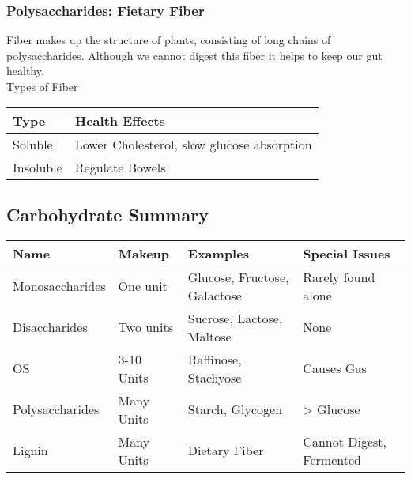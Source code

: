 \documentclass[letterpaper, 11pt]{article}
\begin{document}
\subsubsection{Polysaccharides: Fietary Fiber}
\label{sec:org4a1e430}
Fiber makes up the structure of plants, consisting of long chains of polysaccharides. Although we cannot digest this fiber it helps to keep our gut healthy.\\
Types of Fiber\\
\begin{center}
\begin{tabular}{ll}
Type & Health Effects\\
\hline
Soluble & Lower Cholesterol,  slow glucose absorption\\
Insoluble & Regulate Bowels\\
\end{tabular}
\end{center}
\subsection{Carbohydrate Summary}
\label{sec:org0b6fe23}
\begin{center}
\begin{tabular}{llll}
Name & Makeup & Examples & Special Issues\\
\hline
Monosaccharides & One unit & Glucose, Fructose, Galactose & Rarely found alone\\
Disaccharides & Two units & Sucrose, Lactose, Maltose & None\\
OS & 3-10 Units & Raffinose, Stachyose & Causes Gas\\
Polysaccharides & Many Units & Starch, Glycogen & > Glucose\\
Lignin & Many Units & Dietary Fiber & Cannot Digest, Fermented\\
\end{tabular}
\end{center}
\end{document}

